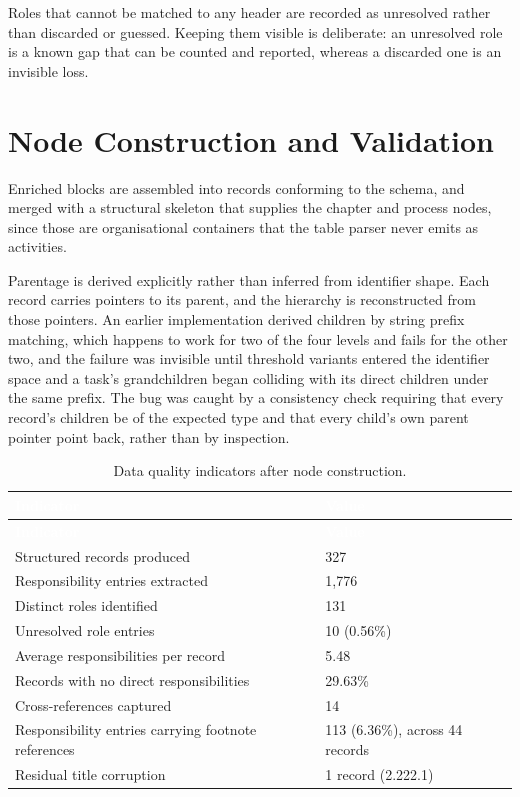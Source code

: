 Roles that cannot be matched to any header are recorded as unresolved rather than discarded or guessed. Keeping them visible is deliberate: an unresolved role is a known gap that can be counted and reported, whereas a discarded one is an invisible loss.

\section{Node Construction and Validation}
\label{sec:nodeconstruction}

Enriched blocks are assembled into records conforming to the schema, and merged with a structural skeleton that supplies the chapter and process nodes, since those are organisational containers that the table parser never emits as activities.

Parentage is derived explicitly rather than inferred from identifier shape. Each record carries pointers to its parent, and the hierarchy is reconstructed from those pointers. An earlier implementation derived children by string prefix matching, which happens to work for two of the four levels and fails for the other two, and the failure was invisible until threshold variants entered the identifier space and a task's grandchildren began colliding with its direct children under the same prefix. The bug was caught by a consistency check requiring that every record's children be of the expected type and that every child's own parent pointer point back, rather than by inspection.

\begin{longtable}{|p{}|p{}|}
\caption{Data quality indicators after node construction.}\label{tab:quality}\\
\hline
\rowcolor{thesisgreen}\textcolor{white}{\textbf{Indicator}} & \textcolor{white}{\textbf{Value}} \\
\hline
\endfirsthead
\hline
\rowcolor{thesisgreen}\textcolor{white}{\textbf{Indicator}} & \textcolor{white}{\textbf{Value}} \\
\hline
\endhead
Structured records produced & 327 \\ \hline
Responsibility entries extracted & 1,776 \\ \hline
Distinct roles identified & 131 \\ \hline
Unresolved role entries & 10 (0.56\%) \\ \hline
Average responsibilities per record & 5.48 \\ \hline
Records with no direct responsibilities & 29.63\% \\ \hline
Cross-references captured & 14 \\ \hline
Responsibility entries carrying footnote references & 113 (6.36\%), across 44 records \\ \hline
Residual title corruption & 1 record (2.222.1) \\ \hline
\end{longtable}

